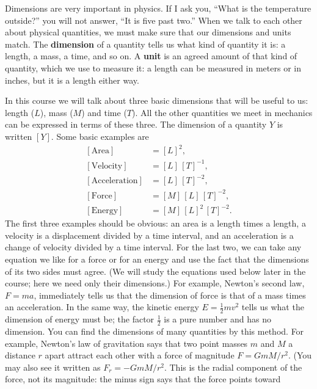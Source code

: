 \documentclass[11pt,a4paper]{article}
\begin{document}
Dimensions are very important in physics. If I ask you, ``What is the temperature outside?'' you
will not answer, ``It is five past two.'' When we talk to each other about physical quantities, we
must make sure that our dimensions and units match. The \textbf{dimension} of a quantity tells us
what kind of quantity it is: a length, a mass, a time, and so on. A \textbf{unit} is an agreed
amount of that kind of quantity, which we use to measure it: a length can be measured in meters
or in inches, but it is a length either way.

In this course we will talk about three basic dimensions that will be useful to us: length
($L$), mass ($M$) and time ($T$). All the other quantities we meet in mechanics can be expressed
in terms of these three. The dimension of a quantity $Y$ is written $[Y]$. Some basic examples
are
\begin{equation}\label{eq:dims}
\begin{aligned}
  [\text{Area}] &= [L]^2 , \\
  [\text{Velocity}] &= [L]\,[T]^{-1} , \\
  [\text{Acceleration}] &= [L]\,[T]^{-2} , \\
  [\text{Force}] &= [M]\,[L]\,[T]^{-2} , \\
  [\text{Energy}] &= [M]\,[L]^2\,[T]^{-2} .
\end{aligned}
\end{equation}
The first three examples should be obvious: an area is a length times a length, a velocity is a
displacement divided by a time interval, and an acceleration is a change of velocity divided by a
time interval. For the last two, we can take any equation we like for a force or for an energy
and use the fact that the dimensions of its two sides must agree. (We will study the equations used below
later in the course; here we need only their dimensions.) For example, Newton's second
law, $F = ma$, immediately tells us that the dimension of force is that of a mass times an
acceleration. In the same way, the kinetic energy $E = \frac{1}{2}mv^2$ tells us what the
dimension of energy must be; the factor $\frac{1}{2}$ is a pure number and has no dimension. You
can find the dimensions of many quantities by this method. For example, Newton's law of
gravitation says that two point masses $m$ and $M$ a distance $r$ apart attract each other with
a force of magnitude $F = GmM/r^2$. (You may also see it written as $F_r = -GmM/r^2$. This is the
radial component of the force, not its magnitude: the minus sign says that the force points toward
\end{document}
